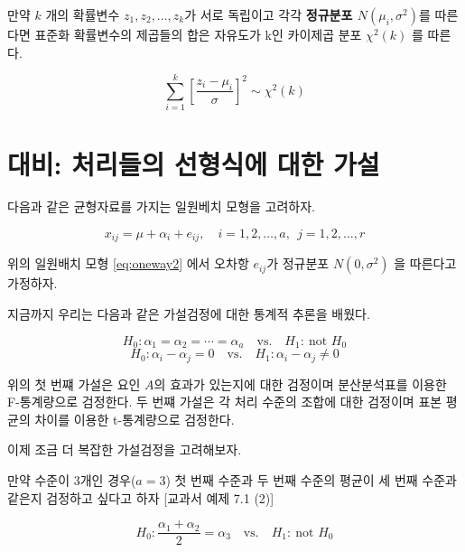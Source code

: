 \documentclass[
]{book}
\begin{document}
만약 \(k\) 개의 확률변수 \(z_1, z_2, \dots, z_k\)가 서로 독립이고 각각 \textbf{정규분포 \(N(\mu_i,\sigma^2)\)}를 따른다면 표준화 확률변수의 제곱들의 합은 자유도가 k인 카이제곱 분포 \(\chi^2(k)\) 를 따른다.

\begin{equation}
\sum_{i=1}^k  \left [ \frac{z_i - \mu_i}{\sigma} \right ]^2 \sim \chi^2(k)
\label{eq:chidist3}
\end{equation}

\hypertarget{uxb300uxbe44-uxcc98uxb9acuxb4e4uxc758-uxc120uxd615uxc2dduxc5d0-uxb300uxd55c-uxac00uxc124}{%
\section{대비: 처리들의 선형식에 대한 가설}\label{uxb300uxbe44-uxcc98uxb9acuxb4e4uxc758-uxc120uxd615uxc2dduxc5d0-uxb300uxd55c-uxac00uxc124}}

다음과 같은 균형자료를 가지는 일원베치 모형을 고려하자.

\begin{equation}
x_{ij} = \mu + \alpha_i + e_{ij}, \quad i=1,2,\dots, a,~~ j= 1,2,\dots, r
\label{eq:oneway2}
\end{equation}

위의 일원배치 모형 \eqref{eq:oneway2} 에서 오차항 \(e_{ij}\)가 정규분포 \(N(0, \sigma^2)\) 을 따른다고 가정하자.

지금까지 우리는 다음과 같은 가설검정에 대한 통계적 추론을 배웠다.

\[ H_0: \alpha_1 = \alpha_2 =\cdots = \alpha_a \quad \text{vs.} \quad H_1: ~ \text{not } H_0\]
\begin{equation}
H_0 : \alpha_i - \alpha_j =0 \quad \text{vs.} \quad H_1: \alpha_i - \alpha_j \ne 0 
\label{eq:hypo0}
\end{equation}

위의 첫 번쨰 가설은 요인 \(A\)의 효과가 있는지에 대한 검정이며 분산분석표를 이용한 F-통계량으로 검정한다. 두 번쨰 가설은 각 처리 수준의 조합에 대한 검정이며 표본 평균의 차이를 이용한 t-통계량으로 검정한다.

이제 조금 더 복잡한 가설검정을 고려해보자.

만약 수준이 3개인 경우(\(a=3\)) 첫 번째 수준과 두 번째 수준의 평균이 세 번째 수준과 같은지 검정하고 싶다고 하자 {[}교과서 예제 7.1 (2){]}

\begin{equation}
H_0 : \frac{\alpha_1 + \alpha_2}{2} = \alpha_3 \quad \text{vs.} \quad H_1: ~ \text{not } H_0 
\label{eq:hypo1}
\end{equation}
\end{document}

